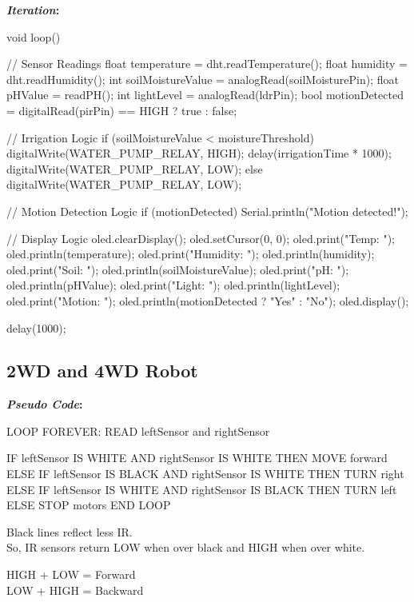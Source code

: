 \pagebreak
\textbf{\textit{Iteration}:}
\begin{arduino}
void loop() {
   // Sensor Readings
   float temperature = dht.readTemperature();
   float humidity = dht.readHumidity();
   int soilMoistureValue = analogRead(soilMoisturePin);
   float pHValue = readPH();
   int lightLevel = analogRead(ldrPin);
   bool motionDetected = digitalRead(pirPin) == HIGH ? true : false;
   
   // Irrigation Logic
   if (soilMoistureValue < moistureThreshold) {
      digitalWrite(WATER_PUMP_RELAY, HIGH);
      delay(irrigationTime * 1000);
      digitalWrite(WATER_PUMP_RELAY, LOW);
   } else {
      digitalWrite(WATER_PUMP_RELAY, LOW);
   }
   
   // Motion Detection Logic
   if (motionDetected) {
      Serial.println("Motion detected!");
   }
   
   // Display Logic
   oled.clearDisplay();
   oled.setCursor(0, 0);
   oled.print("Temp: "); oled.println(temperature);
   oled.print("Humidity: "); oled.println(humidity);
   oled.print("Soil: "); oled.println(soilMoistureValue);
   oled.print("pH: "); oled.println(pHValue);
   oled.print("Light: "); oled.println(lightLevel);
   oled.print("Motion: "); oled.println(motionDetected ? "Yes" : "No");
   oled.display();
   
   delay(1000);
}
\end{arduino}

\pagebreak
\subsection{2WD and 4WD Robot}
\begin{minipage}[t]{0.6\textwidth}
\textbf{\textit{Pseudo Code}:}
\begin{pseudocode}
LOOP FOREVER:
   READ leftSensor and rightSensor

   IF leftSensor IS WHITE AND rightSensor IS WHITE THEN
      MOVE forward
   ELSE IF leftSensor IS BLACK AND rightSensor IS WHITE THEN
      TURN right
   ELSE IF leftSensor IS WHITE AND rightSensor IS BLACK THEN
      TURN left
   ELSE
      STOP motors
END LOOP
\end{pseudocode}
\end{minipage}\hfill
\begin{minipage}[t]{0.3\textwidth}
   Black lines reflect less IR.\\
   So, IR sensors return LOW when over black and HIGH when over white.
   
   \vspace{2em}
   HIGH + LOW = Forward\\
   LOW + HIGH = Backward\\
\end{minipage}


